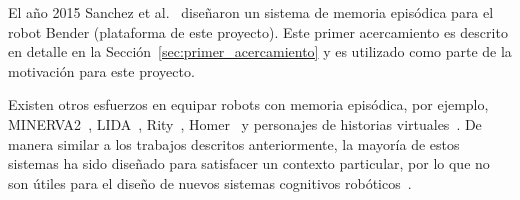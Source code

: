 El año 2015 Sanchez et al.~\cite{Sanchez:2015} diseñaron un sistema de memoria episódica para el robot Bender (plataforma de este proyecto). Este primer acercamiento es descrito en detalle en la Sección~\ref{sec:primer_acercamiento} y es utilizado como parte de la motivación para este proyecto.


Existen otros esfuerzos en equipar robots con memoria episódica, por ejemplo, MINERVA2~\cite{Douglas1988}, LIDA~\cite{Feinstone2006}, Rity~\cite{Kuppuswamy2006}, Homer~\cite{Vere1990} y personajes de historias virtuales~\cite{Brom2007}. De manera similar a los trabajos descritos anteriormente, la mayoría de estos sistemas ha sido diseñado para satisfacer un contexto particular, por lo que no son útiles para el diseño de nuevos sistemas cognitivos robóticos~\cite{Stachowicz2012}.






